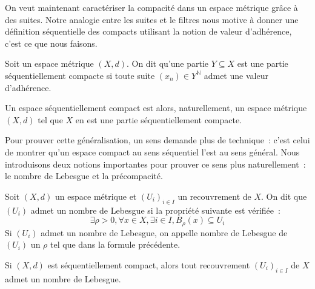 On veut maintenant caractériser la compacité dans un espace métrique grâce à des
suites. Notre analogie entre les suites et le filtres nous motive à donner une
définition séquentielle des compacts utilisant la notion de valeur d'adhérence,
c'est ce que nous faisons.

\begin{definition}
  Soit un espace métrique $(X,d)$. On dit qu'une partie $Y\subseteq X$ est une
  partie séquentiellement compacte si toute suite $(x_n)\in Y^\mathbb N$ admet
  une valeur d'adhérence.
\end{definition}

Un espace séquentiellement compact est alors, naturellement, un espace métrique
$(X,d)$ tel que $X$ en est une partie séquentiellement compacte.

Pour prouver cette généralisation, un sens demande plus de technique~: c'est
celui de montrer qu'un espace compact au sens séquentiel l'est au sens général.
Nous introduisons deux notions importantes pour prouver ce sens plus
naturellement~: le nombre de Lebesgue et la précompacité.

\begin{definition}
  Soit $(X,d)$ un espace métrique et $(U_i)_{i\in I}$ un recouvrement de $X$. On
  dit que $(U_i)$ admet un nombre de Lebesgue si la propriété suivante est
  vérifiée~:
  \[\exists \rho > 0,\forall x \in X, \exists i \in I, B_\rho(x) \subseteq U_i \]
  Si $(U_i)$ admet un nombre de Lebesgue, on appelle nombre de Lebesgue de $(U_i)$ un
  $\rho$ tel que dans la formule précédente.
\end{definition}

\begin{lemma}\label{lem.nb.lebesgue}
  Si $(X,d)$ est séquentiellement compact, alors tout recouvrement
  $(U_i)_{i\in I}$ de $X$ admet un nombre de Lebesgue.
\end{lemma}

